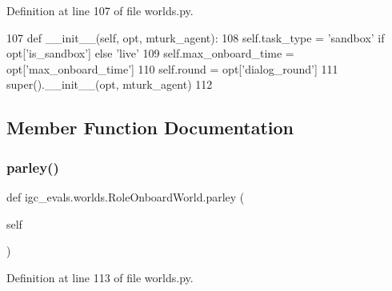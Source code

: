 Definition at line 107 of file worlds.\+py.


\begin{DoxyCode}
107     \textcolor{keyword}{def }\_\_init\_\_(self, opt, mturk\_agent):
108         self.task\_type = \textcolor{stringliteral}{'sandbox'} \textcolor{keywordflow}{if} opt[\textcolor{stringliteral}{'is\_sandbox'}] \textcolor{keywordflow}{else} \textcolor{stringliteral}{'live'}
109         self.max\_onboard\_time = opt[\textcolor{stringliteral}{'max\_onboard\_time'}]
110         self.round = opt[\textcolor{stringliteral}{'dialog\_round'}]
111         super().\_\_init\_\_(opt, mturk\_agent)
112 
\end{DoxyCode}


\subsection{Member Function Documentation}
\mbox{\label{classigc__evals_1_1worlds_1_1RoleOnboardWorld_a84185551f87f342eb5aa827e6d4bc520}} 
\subsubsection{\texorpdfstring{parley()}{parley()}}
{\footnotesize\ttfamily def igc\+\_\+evals.\+worlds.\+Role\+Onboard\+World.\+parley (\begin{DoxyParamCaption}\item[{}]{self }\end{DoxyParamCaption})}



Definition at line 113 of file worlds.\+py.


